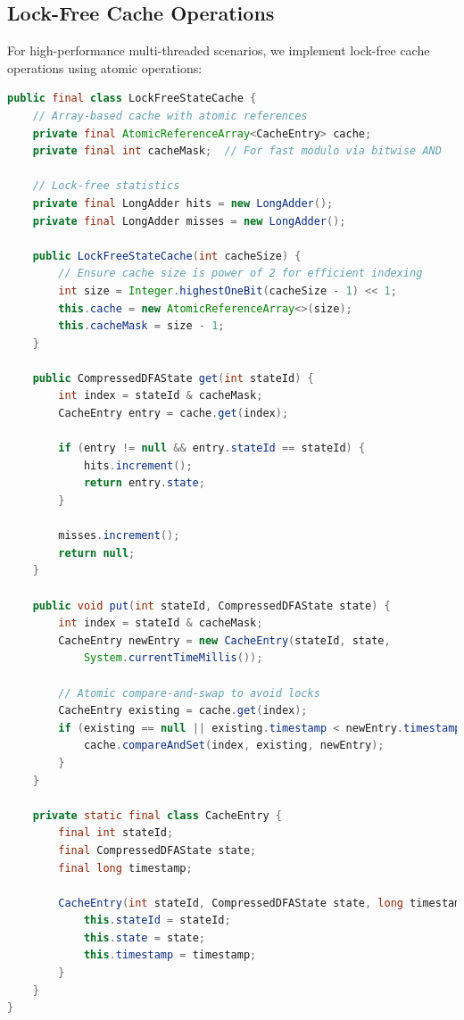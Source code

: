 \documentclass[11pt,a4paper]{article}
\begin{document}
\subsection{Lock-Free Cache Operations}

For high-performance multi-threaded scenarios, we implement lock-free cache operations using atomic operations:

\begin{lstlisting}[language=Java,caption={Lock-Free Cache Operations}]
public final class LockFreeStateCache {
    // Array-based cache with atomic references
    private final AtomicReferenceArray<CacheEntry> cache;
    private final int cacheMask;  // For fast modulo via bitwise AND
    
    // Lock-free statistics
    private final LongAdder hits = new LongAdder();
    private final LongAdder misses = new LongAdder();
    
    public LockFreeStateCache(int cacheSize) {
        // Ensure cache size is power of 2 for efficient indexing
        int size = Integer.highestOneBit(cacheSize - 1) << 1;
        this.cache = new AtomicReferenceArray<>(size);
        this.cacheMask = size - 1;
    }
    
    public CompressedDFAState get(int stateId) {
        int index = stateId & cacheMask;
        CacheEntry entry = cache.get(index);
        
        if (entry != null && entry.stateId == stateId) {
            hits.increment();
            return entry.state;
        }
        
        misses.increment();
        return null;
    }
    
    public void put(int stateId, CompressedDFAState state) {
        int index = stateId & cacheMask;
        CacheEntry newEntry = new CacheEntry(stateId, state, 
            System.currentTimeMillis());
        
        // Atomic compare-and-swap to avoid locks
        CacheEntry existing = cache.get(index);
        if (existing == null || existing.timestamp < newEntry.timestamp) {
            cache.compareAndSet(index, existing, newEntry);
        }
    }
    
    private static final class CacheEntry {
        final int stateId;
        final CompressedDFAState state;
        final long timestamp;
        
        CacheEntry(int stateId, CompressedDFAState state, long timestamp) {
            this.stateId = stateId;
            this.state = state;
            this.timestamp = timestamp;
        }
    }
}
\end{lstlisting}
\end{document}
